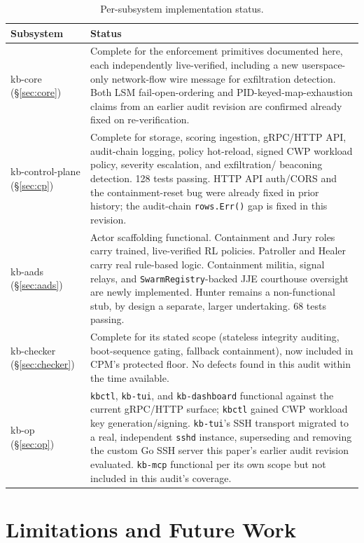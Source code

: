 \documentclass{article}
\begin{document}
\begin{table}[htbp]
\centering
\footnotesize
\caption{Per-subsystem implementation status.}
\label{tab:status}
\begin{tabular}{@{}p{1.5cm}p{5.6cm}@{}}
\toprule
Subsystem & Status \\
\midrule
kb-core (\S\ref{sec:core}) & Complete for the enforcement primitives
documented here, each independently live-verified, including a new
userspace-only network-flow wire message for exfiltration detection.
Both LSM fail-open-ordering and PID-keyed-map-exhaustion claims from an
earlier audit revision are confirmed already fixed on re-verification. \\
kb-control-plane (\S\ref{sec:cp}) & Complete for storage, scoring
ingestion, gRPC/HTTP API, audit-chain logging, policy hot-reload,
signed CWP workload policy, severity escalation, and exfiltration/
beaconing detection. 128 tests passing. HTTP API auth/CORS and the
containment-reset bug were already fixed in prior history; the
audit-chain \texttt{rows.Err()} gap is fixed in this revision. \\
kb-aads (\S\ref{sec:aads}) & Actor scaffolding functional. Containment
and Jury roles carry trained, live-verified RL policies. Patroller and
Healer carry real rule-based logic. Containment militia, signal
relays, and \texttt{SwarmRegistry}-backed JJE courthouse oversight are
newly implemented. Hunter remains a non-functional stub, by design a
separate, larger undertaking. 68 tests passing. \\
kb-checker (\S\ref{sec:checker}) & Complete for its stated scope
(stateless integrity auditing, boot-sequence gating, fallback
containment), now included in CPM's protected floor. No defects found
in this audit within the time available. \\
kb-op (\S\ref{sec:op}) & \texttt{kbctl}, \texttt{kb-tui}, and
\texttt{kb-dashboard} functional against the current gRPC/HTTP
surface; \texttt{kbctl} gained CWP workload key generation/signing.
\texttt{kb-tui}'s SSH transport migrated to a real, independent
\texttt{sshd} instance, superseding and removing the custom Go SSH
server this paper's earlier audit revision evaluated. \texttt{kb-mcp}
functional per its own scope but not included in this audit's
coverage. \\
\bottomrule
\end{tabular}
\end{table}

\section{Limitations and Future Work}
\end{document}
